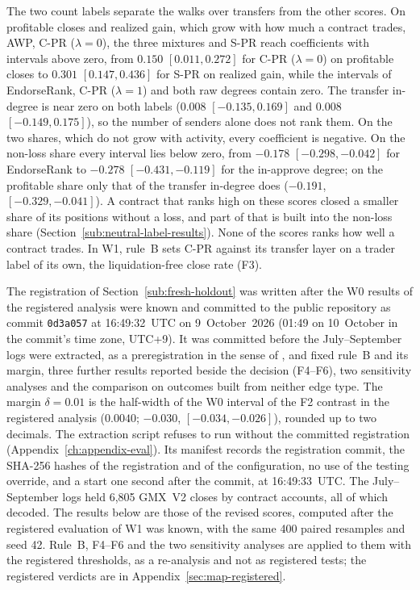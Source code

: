 

The two count labels separate the walks over transfers from the other scores. On profitable closes and realized gain, which grow with how much a contract trades, AWP, C-PR ($\lambda=0$), the three mixtures and S-PR reach coefficients with intervals above zero, from $0.150$ $[0.011,0.272]$ for C-PR ($\lambda=0$) on profitable closes to $0.301$ $[0.147,0.436]$ for S-PR on realized gain, while the intervals of EndorseRank, C-PR ($\lambda=1$) and both raw degrees contain zero. The transfer in-degree is near zero on both labels ($0.008$ $[-0.135,0.169]$ and $0.008$ $[-0.149,0.175]$), so the number of senders alone does not rank them. On the two shares, which do not grow with activity, every coefficient is negative. On the non-loss share every interval lies below zero, from $-0.178$ $[-0.298,-0.042]$ for EndorseRank to $-0.278$ $[-0.431,-0.119]$ for the in-approve degree; on the profitable share only that of the transfer in-degree does ($-0.191$, $[-0.329,-0.041]$). A contract that ranks high on these scores closed a smaller share of its positions without a loss, and part of that is built into the non-loss share (Section~\ref{sub:neutral-label-results}). None of the scores ranks how well a contract trades. In W1, rule~B sets C-PR against its transfer layer on a trader label of its own, the liquidation-free close rate (F3).


The registration of Section~\ref{sub:fresh-holdout} was written after the W0 results of the registered analysis were known and committed to the public repository as commit \texttt{0d3a057} at 16:49:32~UTC on 9~October~2026 (01:49 on 10~October in the commit's time zone, UTC+9). It was committed before the July--September logs were extracted, as a preregistration in the sense of \textcite{nosek2018preregistration}, and fixed rule~B and its margin, three further results reported beside the decision (F4--F6), two sensitivity analyses and the comparison on outcomes built from neither edge type. The margin $\delta=0.01$ is the half-width of the W0 interval of the F2 contrast in the registered analysis ($0.0040$; $-0.030$, $[-0.034,-0.026]$), rounded up to two decimals. The extraction script refuses to run without the committed registration (Appendix~\ref{ch:appendix-eval}). Its manifest records the registration commit, the SHA-256 hashes of the registration and of the configuration, no use of the testing override, and a start one second after the commit, at 16:49:33~UTC. The July--September logs held 6,805 GMX~V2 closes by contract accounts, all of which decoded. The results below are those of the revised scores, computed after the registered evaluation of W1 was known, with the same 400 paired resamples and seed 42. Rule~B, F4--F6 and the two sensitivity analyses are applied to them with the registered thresholds, as a re-analysis and not as registered tests; the registered verdicts are in Appendix~\ref{sec:map-registered}.

